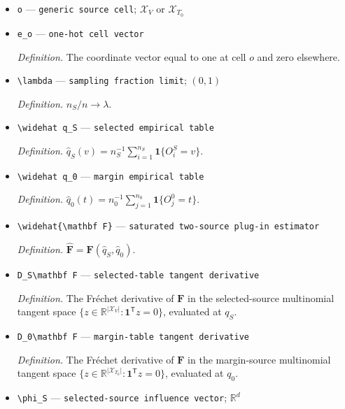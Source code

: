 \documentclass{article}
\begin{document}
\begin{itemize}
  \item \texttt{o} --- \texttt{generic source cell}; \(\mathcal X_V\) or \(\mathcal X_{T_0}\)
  \item \texttt{e\_\allowbreak{}o} --- \texttt{one-\allowbreak{}hot cell vector}
  \par\smallskip\noindent\emph{Definition.} The coordinate vector equal to one at cell \(o\) and zero elsewhere.
  \item \texttt{\textbackslash{}\allowbreak{}lambda} --- \texttt{sampling fraction limit}; \((0,1)\)
  \par\smallskip\noindent\emph{Definition.} \(n_S/n\to\lambda\).
  \item \texttt{\textbackslash{}\allowbreak{}widehat q\_\allowbreak{}S} --- \texttt{selected empirical table}
  \par\smallskip\noindent\emph{Definition.} \(\widehat q_S(v)=n_S^{-1}\sum_{i=1}^{n_S}\mathbf 1\{O_i^S=v\}\).
  \item \texttt{\textbackslash{}\allowbreak{}widehat q\_\allowbreak{}0} --- \texttt{margin empirical table}
  \par\smallskip\noindent\emph{Definition.} \(\widehat q_0(t)=n_0^{-1}\sum_{j=1}^{n_0}\mathbf 1\{O_j^0=t\}\).
  \item \texttt{\textbackslash{}\allowbreak{}widehat\{\textbackslash{}\allowbreak{}mathbf F\}\allowbreak{}} --- \texttt{saturated two-\allowbreak{}source plug-\allowbreak{}in estimator}
  \par\smallskip\noindent\emph{Definition.} \(\widehat{\mathbf F}=\mathbf F(\widehat q_S,\widehat q_0)\).
  \item \texttt{D\_\allowbreak{}S\textbackslash{}\allowbreak{}mathbf F} --- \texttt{selected-\allowbreak{}table tangent derivative}
  \par\smallskip\noindent\emph{Definition.} The Fréchet derivative of \(\mathbf F\) in the selected-source multinomial tangent space \(\{z\in\mathbb R^{\lvert\mathcal X_V\rvert}:\mathbf 1^{\mathsf T}z=0\}\), evaluated at \(q_S\).
  \item \texttt{D\_\allowbreak{}0\textbackslash{}\allowbreak{}mathbf F} --- \texttt{margin-\allowbreak{}table tangent derivative}
  \par\smallskip\noindent\emph{Definition.} The Fréchet derivative of \(\mathbf F\) in the margin-source multinomial tangent space \(\{z\in\mathbb R^{\lvert\mathcal X_{T_0}\rvert}:\mathbf 1^{\mathsf T}z=0\}\), evaluated at \(q_0\).
  \item \texttt{\textbackslash{}\allowbreak{}phi\_\allowbreak{}S} --- \texttt{selected-\allowbreak{}source influence vector}; \(\mathbb R^d\)

\end{itemize}
\end{document}
